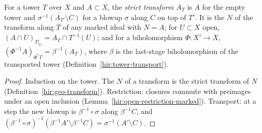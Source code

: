 \begin{definition}
\label{mc:strict-along}
\leanok
For a tower \(T\) over \(X\) and \(A\subset X\), the \emph{strict transform} \(A_T\) is \(A\) for the empty tower and
\(\overline{\sigma^{-1}(A_{T'}\setminus C)}\) for a blowup \(\sigma\) along \(C\) on top of \(T'\). It is the \(N\) of the transform along \(T\) of any marked
ideal with \(N=A\); for \(U\subset X\) open, \((A\cap U)_{T|_U}=A_T\cap T^{-1}(U)\); and for a biholomorphism \(\Phi\colon X'\to X\),
\((\Phi^{-1}A)_{\Phi^*T}=\beta^{-1}(A_T)\), where \(\beta\) is the last-stage biholomorphism of the transported tower (Definition~\ref{hir:tower-transport}).
\end{definition}
\begin{proof}
\leanok
Induction on the tower. The \(N\) of a transform is the strict transform of \(N\) (Definition~\ref{hir:geo-transform}). Restriction: closures commute with
preimages under an open inclusion (Lemma~\ref{hir:open-restriction-marked}). Transport: at a step the new blowup is \(\beta^{-1}\circ\sigma\) along
\(\beta^{-1}C\), and \((\beta^{-1}\circ\sigma)^{-1}(\beta^{-1}A'\setminus\beta^{-1}C)=\sigma^{-1}(A'\setminus C)\).
\end{proof}

